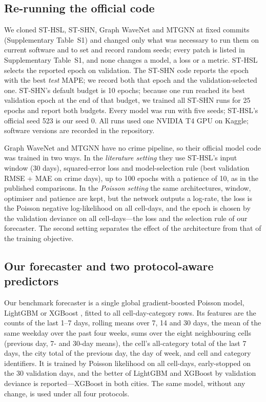 \documentclass[preprint,12pt,authoryear]{elsarticle}
\begin{document}
\subsection{Re-running the official code}\label{sec:reruns}
We cloned ST-HSL, ST-SHN, Graph WaveNet and MTGNN at fixed commits (Supplementary Table~S1) and changed only what was necessary to run them on current software and to set and record random seeds; every patch is listed in Supplementary Table~S1, and none changes a model, a loss or a metric. ST-HSL selects the reported epoch on validation. The ST-SHN code reports the epoch with the best \emph{test} MAPE; we record both that epoch and the validation-selected one. ST-SHN's default budget is 10 epochs; because one run reached its best validation epoch at the end of that budget, we trained all ST-SHN runs for 25 epochs and report both budgets. Every model was run with five seeds; ST-HSL's official seed 523 is our seed 0. All runs used one NVIDIA T4 GPU on Kaggle; software versions are recorded in the repository.

Graph WaveNet and MTGNN have no crime pipeline, so their official model code was trained in two ways. In the \emph{literature setting} they use ST-HSL's input window (30 days), squared-error loss and model-selection rule (best validation RMSE + MAE on crime days), up to 100 epochs with a patience of 10, as in the published comparisons. In the \emph{Poisson setting} the same architectures, window, optimiser and patience are kept, but the network outputs a log-rate, the loss is the Poisson negative log-likelihood on all cell-days, and the epoch is chosen by the validation deviance on all cell-days---the loss and the selection rule of our forecaster. The second setting separates the effect of the architecture from that of the training objective.

\subsection{Our forecaster and two protocol-aware predictors}\label{sec:ours}
Our benchmark forecaster is a single global gradient-boosted Poisson model, LightGBM \citep{ke2017lightgbm} or XGBoost \citep{chen2016xgboost}, fitted to all cell-day-category rows. Its features are the counts of the last 1--7 days, rolling means over 7, 14 and 30 days, the mean of the same weekday over the past four weeks, sums over the eight neighbouring cells (previous day, 7- and 30-day means), the cell's all-category total of the last 7 days, the city total of the previous day, the day of week, and cell and category identifiers. It is trained by Poisson likelihood on all cell-days, early-stopped on the 30 validation days, and the better of LightGBM and XGBoost by validation deviance is reported---XGBoost in both cities. The same model, without any change, is used under all four protocols.
\end{document}
